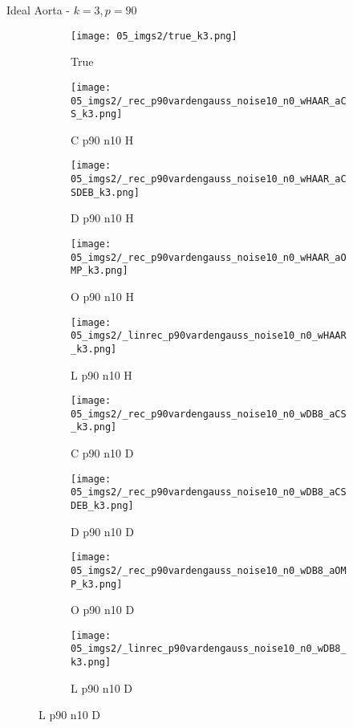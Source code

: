 \begin{frame}{Ideal Aorta - $k=3,p=90$}{}
\begin{figure}
\begin{subfigure}{0.1\textwidth}
\texttt{[image: 05\_imgs2/true\_k3.png]}
\caption*{\Tiny True}
\end{subfigure}
\begin{subfigure}{0.1\textwidth}
\texttt{[image: 05\_imgs2/\_rec\_p90vardengauss\_noise10\_n0\_wHAAR\_aCS\_k3.png]}
\caption*{\Tiny C p90 n10 H}
\end{subfigure}
\begin{subfigure}{0.1\textwidth}
\texttt{[image: 05\_imgs2/\_rec\_p90vardengauss\_noise10\_n0\_wHAAR\_aCSDEB\_k3.png]}
\caption*{\Tiny D p90 n10 H}
\end{subfigure}
\begin{subfigure}{0.1\textwidth}
\texttt{[image: 05\_imgs2/\_rec\_p90vardengauss\_noise10\_n0\_wHAAR\_aOMP\_k3.png]}
\caption*{\Tiny O p90 n10 H}
\end{subfigure}
\begin{subfigure}{0.1\textwidth}
\texttt{[image: 05\_imgs2/\_linrec\_p90vardengauss\_noise10\_n0\_wHAAR\_k3.png]}
\caption*{\Tiny L p90 n10 H}
\end{subfigure}
\begin{subfigure}{0.1\textwidth}
\texttt{[image: 05\_imgs2/\_rec\_p90vardengauss\_noise10\_n0\_wDB8\_aCS\_k3.png]}
\caption*{\Tiny C p90 n10 D}
\end{subfigure}
\begin{subfigure}{0.1\textwidth}
\texttt{[image: 05\_imgs2/\_rec\_p90vardengauss\_noise10\_n0\_wDB8\_aCSDEB\_k3.png]}
\caption*{\Tiny D p90 n10 D}
\end{subfigure}
\begin{subfigure}{0.1\textwidth}
\texttt{[image: 05\_imgs2/\_rec\_p90vardengauss\_noise10\_n0\_wDB8\_aOMP\_k3.png]}
\caption*{\Tiny O p90 n10 D}
\end{subfigure}
\begin{subfigure}{0.1\textwidth}
\texttt{[image: 05\_imgs2/\_linrec\_p90vardengauss\_noise10\_n0\_wDB8\_k3.png]}
\caption*{\Tiny L p90 n10 D}
\end{subfigure}
\vspace{5pt}


\end{figure}
\end{frame}
